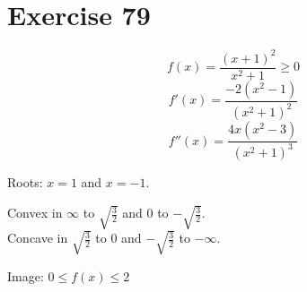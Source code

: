 \documentclass[a4paper]{article}
\theoremstyle{definition}
\begin{document}
\section{Exercise 79}
%
\[ f(x) = \frac{(x+1)^2}{x^2 + 1} \geq 0 \]
\[ f'(x) = \frac{-2(x^2 - 1)}{(x^2 + 1)^2} \]
\[ f''(x) = \frac{4x(x^2 - 3)}{(x^2 + 1)^3} \]

Roots: $x=1$ and $x=-1$.

Convex in $\infty$ to $\sqrt{\frac32}$ and $0$ to $-\sqrt{\frac32}$. \\
Concave in $\sqrt{\frac32}$ to $0$ and $-\sqrt{\frac32}$ to $-\infty$.

Image: $0 \leq f(x) \leq 2$
\end{document}
